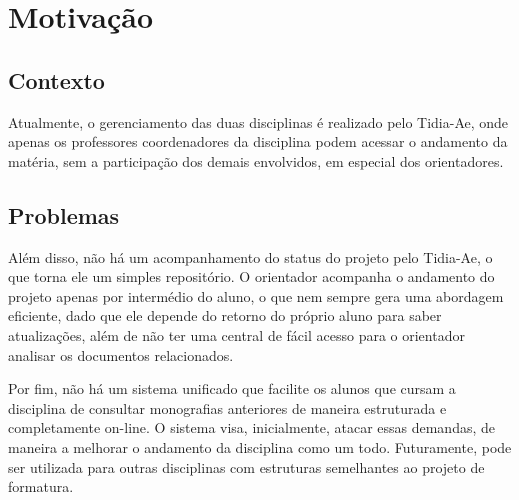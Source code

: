\chapter{Motivação}

\section{Contexto}
Atualmente, o gerenciamento das duas disciplinas é realizado pelo Tidia-Ae, onde apenas os professores coordenadores da disciplina podem acessar o andamento da matéria, sem a participação dos demais envolvidos, em especial dos orientadores.


\section{Problemas}
Além disso, não há um acompanhamento do status do projeto pelo Tidia-Ae, o que torna ele um simples repositório. O orientador acompanha o andamento do projeto apenas por intermédio do aluno, o que nem sempre gera uma abordagem eficiente, dado que ele depende do retorno do próprio aluno para saber atualizações, além de não ter uma central de fácil acesso para o orientador analisar os documentos relacionados.
  
Por fim, não há um sistema unificado que facilite os alunos que cursam a disciplina de consultar monografias anteriores de maneira estruturada e completamente on-line. O sistema visa, inicialmente, atacar essas demandas, de maneira a melhorar o andamento da disciplina como um todo. Futuramente, pode ser utilizada para outras disciplinas com estruturas semelhantes ao projeto de formatura.
